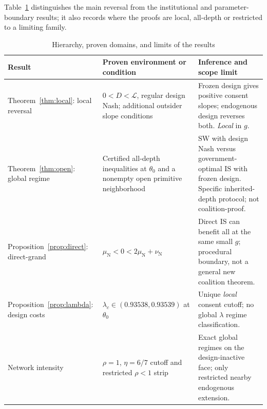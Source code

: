 \documentclass[11pt,a4paper]{article}
\theoremstyle{remark}\newtheorem{remark}[theorem]{Remark}
\newcommand{\SW}{\mathrm{SW}}\newcommand{\SU}{\mathrm{SU}}\newcommand{\IS}{\mathrm{IS}}
\newcommand{\N}{\mathrm{N}}\newcommand{\F}{\mathrm{F}}
\begin{document}
Table~\ref{tab:map} distinguishes the main reversal from the institutional and parameter-boundary results; it also records where the proofs are local, all-depth or restricted to a limiting family.


\begin{table}[tbp]
\centering\footnotesize
\caption{Hierarchy, proven domains, and limits of the results}\label{tab:map}
\renewcommand{\arraystretch}{1.22}
\begin{tabularx}{\linewidth}{@{}>{\raggedright\arraybackslash}p{.18\linewidth}>{\raggedright\arraybackslash}p{.34\linewidth}>{\raggedright\arraybackslash}X@{}}
\toprule
Result & Proven environment or condition & Inference and scope limit \\
\midrule
Theorem~\ref{thm:local}: local reversal & $0<D<\mathcal L$, regular design Nash; additional outsider slope conditions & Frozen design gives positive consent slopes; endogenous design reverses both. \emph{Local} in $g$. \\
Theorem~\ref{thm:open}: global regime & Certified all-depth inequalities at $\theta_0$ and a nonempty open primitive neighborhood & $\SW$ with design Nash versus government-optimal $\IS$ with frozen design. Specific inherited-depth protocol; not coalition-proof. \\
Proposition~\ref{prop:direct}: direct-grand & $\mu_{\N}<0<2\mu_{\N}+\nu_{\N}$ & Direct $\IS$ can benefit all at the same small $g$; procedural boundary, not a general new coalition theorem. \\
Proposition~\ref{prop:lambda}: design costs & $\lambda_c\in(0.93538,0.93539)$ at $\theta_0$ & Unique \emph{local} consent cutoff; no global $\lambda$ regime classification. \\
Network intensity & $\rho=1$, $\eta=6/7$ cutoff and restricted $\rho<1$ strip & Exact global regimes on the design-inactive face; only restricted nearby endogenous extension. \\
\bottomrule
\end{tabularx}
\end{table}
\end{document}

